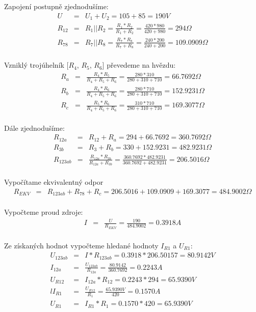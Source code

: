\documentclass[a4paper,oneside,12pt]{article}
\begin{document}
	Zapojení postupně zjednodušíme:
	\begin{eqnarray*}
		U &= & U_{1} + U_{2} = 105 + 85 = 190V\\
		R_{12} &= & R_{1} || R_{2} = \frac{R_{1} * R_{2}}{R_{1} + R_{2}} = \frac{420 * 980}{420 + 980} = 294 \Omega\\
		R_{78} &= & R_{7} || R_{8} = \frac{R_{7} * R_{8}}{R_{7} + R_{8}} = \frac{240 * 200}{240 + 200} = 109.0909 \Omega\\
	\end{eqnarray*}

	Vzniklý trojúhelník [$R_{4}$, $R_{5}$, $R_{6}$] převedeme na hvězdu:
	\begin{eqnarray*}
		R_{a} &= & \frac{R_{4} * R_{5}}{R_{4} + R_{5} + R_{6}} = \frac{280 * 310}{280 + 310 + 710} = 66.7692 \Omega\\
		R_{b} &= & \frac{R_{4} * R_{6}}{R_{4} + R_{5} + R_{6}} = \frac{280 * 710}{280 + 310 + 710} = 152.9231 \Omega\\
		R_{c} &= & \frac{R_{5} * R_{6}}{R_{4} + R_{5} + R_{6}} = \frac{310 * 710}{280 + 310 + 710} = 169.3077 \Omega\\
	\end{eqnarray*}

	Dále zjednodušíme:
	\begin{eqnarray*}
		R_{12a} &= & R_{12} + R_{a} = 294 + 66.7692 = 360.7692 \Omega\\
		R_{3b} &= & R_{3} + R_{b} = 330 + 152.9231 = 482.9231 \Omega\\
		R_{123ab} &= & \frac{R_{12a} * R_{3b}}{R_{12a} + R_{3b}} = \frac{360.7692 * 482.9231}{360.7692 + 482.9231} = 206.5016 \Omega\\
	\end{eqnarray*}

	Vypočítame ekvivalentný odpor
	\begin{eqnarray*}
		R_{EKV} &= & R_{123ab} + R_{78} + R_{c} = 206.5016 + 109.0909 + 169.3077 = 484.9002 \Omega\\
	\end{eqnarray*}

	Vypočteme proud zdroje:
	\begin{eqnarray*}
		I &= & \frac{U}{R_{EKV}} = \frac{190}{484.9002} = 0.3918 A\\
	\end{eqnarray*}

	Ze získaných hodnot vypočteme hledané hodnoty $I_{R1}$ a $U_{R1}$:
	\begin{eqnarray*}
		U_{123ab} &= & I * R_{123ab} = 0.3918 * 206.50157 = 80.9142V\\
		I_{12a} &= &\frac{U_{123ab}}{R_{12a}} = \frac{80.9142}{360.7692} = 0.2243A\\
		U_{R12} &= & I_{12a} * R_{12} = 0.2243 * 294 = 65.9390V\\
l		I_{R1} &= &\frac{U_{R12}}{R_{1}} = \frac{65.9390V}{420} = 0.1570A\\
		U_{R1} &= & I_{R1} * R_{1} = 0.1570 * 420 = 65.9390V\\
	\end{eqnarray*}
\end{document}
